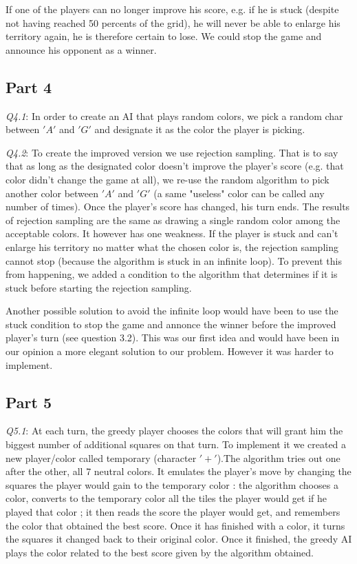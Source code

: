 \documentclass[a4paper]{article}
\begin{document}
If one of the players can no longer improve his score, e.g. if he is stuck (despite not having reached 50 percents of
 the grid), he will never be able to enlarge his territory again, he is therefore certain to lose. We could stop the game and announce
  his opponent as a winner.\newline

\subsection{Part 4}

\emph{Q4.1}: In order to create an AI that plays random colors, we pick a random char between $'A'$ and $'G'$ and designate it as the color the player is picking.\newline

\emph{Q4.2}: To create the improved version we use rejection sampling. That is to say that as long as the designated color doesn't
 improve the player's score (e.g. that color didn't change the game at all), we re-use the random algorithm to pick another color between $'A'$ and $'G'$  (a same "useless" color can be called any number of times). Once the player's score has changed, his turn ends. The results
 of rejection sampling are the same as drawing a single random color among the acceptable colors. It however has one weakness.
  If the player is stuck and can't enlarge his territory no matter what the chosen color is, the rejection sampling cannot
 stop (because the algorithm is stuck in an infinite loop). To prevent this from happening, we added a condition to the algorithm that determines if it is stuck before starting the rejection sampling.

Another possible solution to avoid the infinite loop would have been to use the stuck condition to stop the game and annonce the winner
 before the improved player's turn (see question 3.2). 
 This was our first idea and would have been in our opinion a more elegant
 solution to our problem. However it was harder to implement.
 \newline

\subsection{Part 5}

\emph{Q5.1}: At each turn, the greedy player chooses the colors that will grant him the biggest number of additional squares on that turn.
To implement it we created a new player/color called temporary (character $'+'$).The algorithm tries out one after the other, all 7 neutral colors.
 It emulates the player's move by changing the squares the player would gain to the temporary color : the algorithm chooses a color, converts to the temporary color all the tiles the player would get if he played that color ; it then reads the score the player would get, and remembers the color
 that obtained the best score. Once it has finished with a color, it turns the squares it changed back to their original color. Once it finished, the greedy AI plays the color related to the best score given by the algorithm obtained.
 
\end{document}
